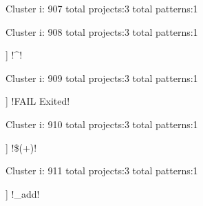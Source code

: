 Cluster i: 907
total projects:3
total patterns:1
\begin{multicols}{1}
\end{multicols}







Cluster i: 908
total projects:3
total patterns:1
\begin{multicols}{1}
\begin{description}[noitemsep,topsep=0pt]
\item [[3] ] \cverb!^\/\w\/!
\end{description}
\end{multicols}







Cluster i: 909
total projects:3
total patterns:1
\begin{multicols}{1}
\begin{description}[noitemsep,topsep=0pt]
\item [[3] ] \cverb!FAIL Exited!
\end{description}
\end{multicols}







Cluster i: 910
total projects:3
total patterns:1
\begin{multicols}{1}
\begin{description}[noitemsep,topsep=0pt]
\item [[3] ] \cverb!\${(\w+)}!
\end{description}
\end{multicols}







Cluster i: 911
total projects:3
total patterns:1
\begin{multicols}{1}
\begin{description}[noitemsep,topsep=0pt]
\item [[3] ] \cverb!\ndrive_add!
\end{description}
\end{multicols}







